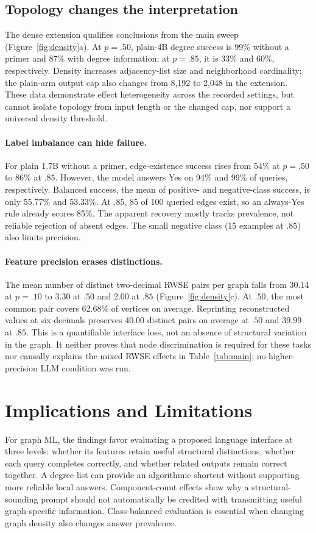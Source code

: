 \documentclass[11pt]{article}
\begin{document}
\subsection{Topology changes the interpretation}
The dense extension qualifies conclusions from the main sweep (Figure~\ref{fig:density}a). At $p=.50$, plain-4B degree success is 99\% without a primer and 87\% with degree information; at $p=.85$, it is 33\% and 60\%, respectively. Density increases adjacency-list size and neighborhood cardinality; the plain-arm output cap also changes from 8,192 to 2,048 in the extension. These data demonstrate effect heterogeneity across the recorded settings, but cannot isolate topology from input length or the changed cap, nor support a universal density threshold.

\paragraph{Label imbalance can hide failure.}
For plain 1.7B without a primer, edge-existence success rises from 54\% at $p=.50$ to 86\% at $.85$. However, the model answers Yes on 94\% and 99\% of queries, respectively. Balanced success, the mean of positive- and negative-class success, is only 55.77\% and 53.33\%. At $.85$, 85 of 100 queried edges exist, so an always-Yes rule already scores 85\%. The apparent recovery mostly tracks prevalence, not reliable rejection of absent edges. The small negative class (15 examples at $.85$) also limits precision.

\paragraph{Feature precision erases distinctions.}
The mean number of distinct two-decimal RWSE pairs per graph falls from 30.14 at $p=.10$ to 3.30 at $.50$ and 2.00 at $.85$ (Figure~\ref{fig:density}c). At $.50$, the most common pair covers 62.68\% of vertices on average. Reprinting reconstructed values at six decimals preserves 40.00 distinct pairs on average at $.50$ and 39.99 at $.85$. This is a quantifiable interface loss, not an absence of structural variation in the graph. It neither proves that node discrimination is required for these tasks nor causally explains the mixed RWSE effects in Table~\ref{tab:main}; no higher-precision LLM condition was run.

\section{Implications and Limitations}
For graph ML, the findings favor evaluating a proposed language interface at three levels: whether its features retain useful structural distinctions, whether each query completes correctly, and whether related outputs remain correct together. A degree list can provide an algorithmic shortcut without supporting more reliable local answers. Component-count effects show why a structural-sounding prompt should not automatically be credited with transmitting useful graph-specific information. Class-balanced evaluation is essential when changing graph density also changes answer prevalence.
\end{document}
